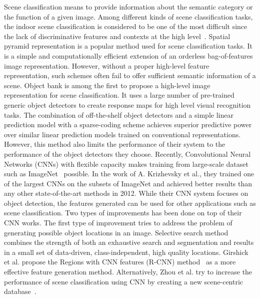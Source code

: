 
Scene classification means to provide information about the semantic category
or the function of a given image. Among different kinds of scene classification
tasks, the indoor scene classification is considered to be one of the most
difficult since the lack of discriminative features and contexts at the high
level~\cite{Quattoni:2009:RIS}. Spatial pyramid
representation\cite{Lazebnik:2006:BBF} is a popular method used for scene
classification tasks. It is a simple and computationally efficient extension of
an orderless bag-of-features image representation. However, without a proper
high-level feature representation, such schemes often fail to offer sufficient
semantic information of a scene. Object bank\cite{Li:2010:OBA} is among the
first to propose a high-level image representation for scene classification. It
uses a large number of pre-trained generic object detectors to create response
maps for high level visual recognition tasks. The combination of off-the-shelf
object detectors and a simple linear prediction model with a sparse-coding
scheme achieves superior predictive power over similar linear prediction models
trained on conventional representations. However, this method also limits the
performance of their system to the performance of the object detectors they
choose. Recently, Convolutional Neural Networks (CNNs) with flexible capacity
makes training from large-scale dataset such as ImageNet~\cite{Deng:2009:IAL}
possible. In the work of A. Krizhevsky et al.\cite{Krizhevsky:2012:ICD}, they
trained one of the largest CNNs on the subsets of ImageNet and achieved better
results than any other state-of-the-art methods in 2012. While their CNN system
focuses on object detection, the features generated can be used for other
applications such as scene classification. Two types of improvements has been
done on top of their CNN works. The first type of improvement tries to address
the problem of generating possible object locations in an image. Selective
search method~\cite{Uijlings:2013:SSO} combines the strength of both an
exhaustive search and segmentation and results in a small set of data-driven,
class-independent, high quality locations. Girshick et al. propose the Regions
with CNN features (R-CNN) method~\cite{Girshick:2013:RFH} as a more effective
feature generation method. Alternatively, Zhou et al. try to increase the
performance of scene classification using CNN by creating a new scene-centric
database~\cite{Zhou:2014:LDF}.
